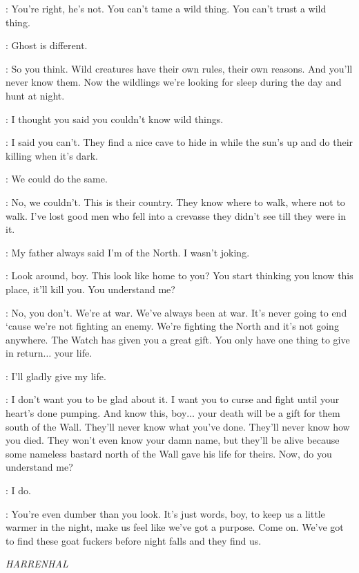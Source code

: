 \HALFHAND: You're right, he's not. You can't tame a wild thing. You can't trust a wild thing. 

\JON: Ghost is different. 

\HALFHAND: So you think. Wild creatures have their own rules, their own reasons. And you'll never know them. Now the wildlings we're looking for sleep during the day and hunt at night. 

\JON: I thought you said you couldn't know wild things. 

\HALFHAND: I said you can't. They find a nice cave to hide in while the sun's up and do their killing when it's dark. 

\JON: We could do the same. 

\HALFHAND: No, we couldn't. This is their country. They know where to walk, where not to walk. I've lost good men who fell into a crevasse they didn't see till they were in it. 

\JON: My father always said I'm of the North.  I wasn't joking. 

\HALFHAND: Look around, boy. This look like home to you? You start thinking you know this place, it'll kill you. You understand me? 


\HALFHAND: No, you don't. We're at war. We've always been at war. It's never going to end `cause we're not fighting an enemy. We're fighting the North and it's not going anywhere. The Watch has given you a great gift. You only have one thing to give in return$\ldots$ your life. 

\JON: I'll gladly give my life. 

\HALFHAND: I don't want you to be glad about it. I want you to curse and fight until your heart's done pumping. 
And know this, boy$\ldots$ your death will be a gift for them south of the Wall. They'll never know what you've done. They'll never know how you died. They won't even know your damn name, but they'll be alive because some nameless bastard north of the Wall gave his life for theirs. Now, do you understand me? 

\JON: I do. 

\HALFHAND: You're even dumber than you look. It's just words, boy, to keep us a little warmer in the night, make us feel like we've got a purpose. Come on. We've got to find these goat fuckers before night falls and they find us. 


\scene

\textit{HARRENHAL} 

